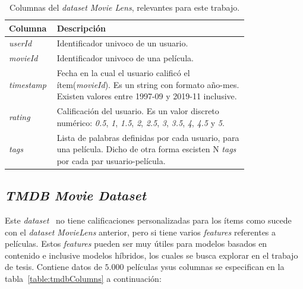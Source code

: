 \documentclass[11pt,a4paper,twoside]{thesis}
\begin{document}
\begin{table}[!htb]
	\centering
	\footnotesize
	\begin{tabular}{l | p{0.8\linewidth}}
		\hline
		Columna            & Descripción                                                                                                                                                                                 \\
		\hline
		\textit{userId}    & Identificador univoco de un usuario.                                                                                                                                                        \\
		\textit{movieId}   & Identificador univoco de una película.                                                                                                                                                      \\
		\textit{timestamp} & Fecha en la cual el usuario calificó el ítem(\textit{movieId}). Es un string con formato año-mes. Existen valores entre 1997-09 y 2019-11 inclusive.                                        \\
		\textit{rating}    & Calificación del usuario. Es un valor discreto numérico: \textit{0.5}, \textit{1}, \textit{1.5}, \textit{2}, \textit{2.5}, \textit{3}, \textit{3.5}, \textit{4}, \textit{4.5} y \textit{5}. \\
		\textit{tags}      & Lista de palabras definidas por cada usuario, para una película. Dicho de otra forma escisten N \textit{tags} por cada par usuario-película.                                                \\
		\hline
	\end{tabular}
	\caption{
		Columnas del \textit{dataset} \textit{Movie Lens}, relevantes para este trabajo.
	}
	\label{table:movieLensColumns}
\end{table}

\clearpage

\subsection{\textit{TMDB Movie Dataset}}

Este \textit{dataset}~\cite{tmdb} no tiene calificaciones personalizadas para
los ítems como sucede con el \textit{dataset MovieLens} anterior, pero si tiene
varios \textit{features} referentes a películas. Estos \textit{features} pueden
ser muy útiles para modelos basados en contenido e inclusive modelos híbridos,
los cuales se busca explorar en el trabajo de tesis. Contiene datos de $5.000$
películas ysus columnas se especifican en la tabla~\ref{table:tmdbColumns} a
continuación:
\end{document}
